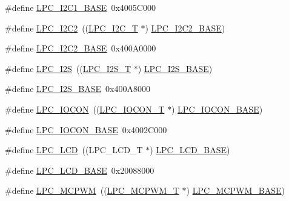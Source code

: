 \begin{DoxyCompactItemize}
\item 
\#define \hyperlink{group__PERIPH__407X__8X__BASE_gae59f73cf24ff126be3b9a8b921926676}{L\+P\+C\+\_\+\+I2\+C1\+\_\+\+B\+A\+SE}~0x4005\+C000
\item 
\#define \hyperlink{group__PERIPH__407X__8X__BASE_ga6bcdaa0ab66f4e3d213a488b34055557}{L\+P\+C\+\_\+\+I2\+C2}~((\hyperlink{structLPC__I2C__T}{L\+P\+C\+\_\+\+I2\+C\+\_\+T}              $\ast$) \hyperlink{group__PERIPH__407X__8X__BASE_ga00796bd1f1fa200bbffcd9e7e8679eaa}{L\+P\+C\+\_\+\+I2\+C2\+\_\+\+B\+A\+SE})
\item 
\#define \hyperlink{group__PERIPH__407X__8X__BASE_ga00796bd1f1fa200bbffcd9e7e8679eaa}{L\+P\+C\+\_\+\+I2\+C2\+\_\+\+B\+A\+SE}~0x400\+A0000
\item 
\#define \hyperlink{group__PERIPH__407X__8X__BASE_ga1d2800cab1a50bdf99efe66d6028b663}{L\+P\+C\+\_\+\+I2S}~((\hyperlink{structLPC__I2S__T}{L\+P\+C\+\_\+\+I2\+S\+\_\+T}              $\ast$) \hyperlink{group__PERIPH__407X__8X__BASE_gacff8b54e3924910d381e6b8ba804050c}{L\+P\+C\+\_\+\+I2\+S\+\_\+\+B\+A\+SE})
\item 
\#define \hyperlink{group__PERIPH__407X__8X__BASE_gacff8b54e3924910d381e6b8ba804050c}{L\+P\+C\+\_\+\+I2\+S\+\_\+\+B\+A\+SE}~0x400\+A8000
\item 
\#define \hyperlink{group__PERIPH__407X__8X__BASE_gaabc651799ba17b0dd4a0114c8d48a145}{L\+P\+C\+\_\+\+I\+O\+C\+ON}~((\hyperlink{structLPC__IOCON__T}{L\+P\+C\+\_\+\+I\+O\+C\+O\+N\+\_\+T}            $\ast$) \hyperlink{group__PERIPH__407X__8X__BASE_gae48aea115d5924805263d7a15402d4fa}{L\+P\+C\+\_\+\+I\+O\+C\+O\+N\+\_\+\+B\+A\+SE})
\item 
\#define \hyperlink{group__PERIPH__407X__8X__BASE_gae48aea115d5924805263d7a15402d4fa}{L\+P\+C\+\_\+\+I\+O\+C\+O\+N\+\_\+\+B\+A\+SE}~0x4002\+C000
\item 
\#define \hyperlink{group__PERIPH__407X__8X__BASE_ga68cb24e38b29356c45f9bb634b35c677}{L\+P\+C\+\_\+\+L\+CD}~((L\+P\+C\+\_\+\+L\+C\+D\+\_\+T              $\ast$) \hyperlink{group__PERIPH__407X__8X__BASE_gae1746cd618a1eb4f24f95255594f159a}{L\+P\+C\+\_\+\+L\+C\+D\+\_\+\+B\+A\+SE})
\item 
\#define \hyperlink{group__PERIPH__407X__8X__BASE_gae1746cd618a1eb4f24f95255594f159a}{L\+P\+C\+\_\+\+L\+C\+D\+\_\+\+B\+A\+SE}~0x20088000
\item 
\#define \hyperlink{group__PERIPH__407X__8X__BASE_ga6fe8e415821195a786b3f0dc5e7fc9fa}{L\+P\+C\+\_\+\+M\+C\+P\+WM}~((\hyperlink{structLPC__MCPWM__T}{L\+P\+C\+\_\+\+M\+C\+P\+W\+M\+\_\+T}            $\ast$) \hyperlink{group__PERIPH__407X__8X__BASE_gad8a41dc802e3ea0ba9457d42a6927c03}{L\+P\+C\+\_\+\+M\+C\+P\+W\+M\+\_\+\+B\+A\+SE})

\end{DoxyCompactItemize}
